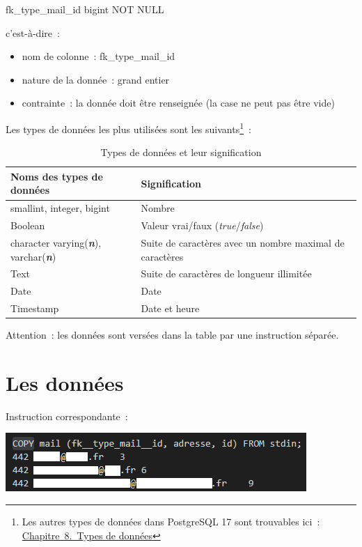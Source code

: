 fk\_type\_mail\_id bigint NOT NULL

c'est-à-dire~:

\begin{itemize}
	\item
	nom de colonne~: fk\_type\_mail\_id
	\item
	nature de la donnée~: grand entier
	\item
	contrainte~: la donnée doit être renseignée (la case ne peut pas être
	vide)
\end{itemize}

Les types de données les plus utilisées sont les suivants\footnote{Les autres types de données dans PostgreSQL 17 sont trouvables ici~: \href{https://docs.postgresql.fr/17/datatype.html}{Chapitre~8.~Types de données}}~:

\begin{table}[h]
	\centering
	\begin{tabular}{|l|l|}
		\hline
		\textbf{Noms des types de données} & \textbf{Signification} \\
		\hline
		smallint, integer, bigint & Nombre \\
		\hline
		Boolean & Valeur vrai/faux (\emph{true}/\emph{false}) \\
		\hline
		character varying(\emph{\textbf{n}}), varchar(\emph{\textbf{n}}) & Suite de caractères avec un nombre maximal de caractères \\
		\hline
		Text & Suite de caractères de longueur illimitée \\
		\hline
		Date & Date \\
		\hline
		Timestamp & Date et heure \\
		\hline
	\end{tabular}
	\caption{Types de données et leur signification}
\end{table}



Attention~: les données sont versées dans la table par une instruction
séparée.

\section*{Les données}

Instruction correspondante~:

\includegraphics{annexes/image6.PNG}

